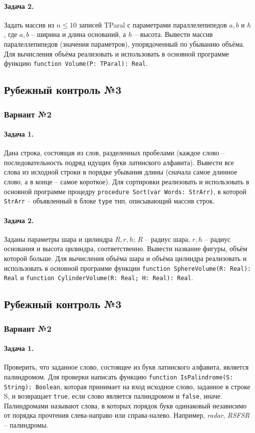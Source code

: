 \documentclass[12pt,a4paper]{report}
\begin{document}
\paragraph*{Задача 2.} Задать массив из $n \le 10$ записей TParal с параметрами параллелепипедов $a, b$ и $h$, где $a, b$ -- ширина и длина оснований, а $h$ -- высота. Вывести массив паралеллепипедов (значения параметров), упорядоченный по убыванию объёма.
Для вычисления объёма реализовать и использовать в основной программе функцию \texttt{function Volume(P: TParal): Real}.
\\
\subsection*{Рубежный контроль №3}
\subsubsection*{Вариант №2}
\paragraph*{Задача 1.} Дана строка, состоящая из слов, разделенных пробелами (каждое слово -- последовательность подряд идущих букв латинского алфавита). Вывести все слова из исходной строки в порядке убывания длины (сначала самое длинное слово, а в конце -- самое короткое). Для сортировки реализовать и использовать в основной программе процедру \texttt{procedure Sort(var Words: StrArr)}, в которой \texttt{StrArr} -- объявленный в блоке \texttt{type} тип, описывающий массив строк.
\paragraph*{Задача 2.} Заданы параметры шара и цилиндра $R, r, h$; $R$ -- радиус шара, $r, h$ -- радиус основания и высота цилиндра, соответственно. Вывести название фигуры, объём которой больше. Для вычисления объёма шара и объёма цилиндра реализовать и использовать в основной программе функции \texttt{function SphereVolume(R: Real): Real} и \texttt{function CylinderVolume(R: Real; H: Real): Real}.

\subsection*{Рубежный контроль №3}
\subsubsection*{Вариант №2}
\paragraph*{Задача 1.} Проверить, что заданное слово, состоящее из букв латинского алфавита, является палиндромом. Для проверки написать функцию \texttt{function IsPalindrome(S: String): Boolean}, которая принимает на вход исходное слово, заданное в строке S, и возвращает \texttt{true}, если слово является палиндромом и \texttt{false}, иначе.
Палиндромами называют слова, в которых порядок букв одинаковый независимо от порядка прочтения слева-направо или справа-налево. Например, \textit{radar}, \textit{RSFSR} -- палиндромы.
\end{document}
